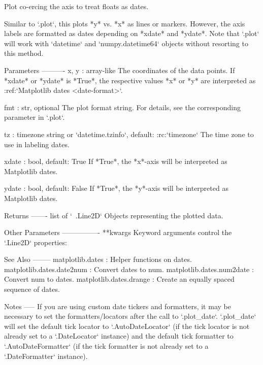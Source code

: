 \begin{DoxyVerb}
\begin{DoxyVerb}Plot co-ercing the axis to treat floats as dates.

Similar to `.plot`, this plots *y* vs. *x* as lines or markers.
However, the axis labels are formatted as dates depending on *xdate*
and *ydate*.  Note that `.plot` will work with `datetime` and
`numpy.datetime64` objects without resorting to this method.

Parameters
----------
x, y : array-like
    The coordinates of the data points. If *xdate* or *ydate* is
    *True*, the respective values *x* or *y* are interpreted as
    :ref:`Matplotlib dates <date-format>`.

fmt : str, optional
    The plot format string. For details, see the corresponding
    parameter in `.plot`.

tz : timezone string or `datetime.tzinfo`, default: :rc:`timezone`
    The time zone to use in labeling dates.

xdate : bool, default: True
    If *True*, the *x*-axis will be interpreted as Matplotlib dates.

ydate : bool, default: False
    If *True*, the *y*-axis will be interpreted as Matplotlib dates.

Returns
-------
list of `~.Line2D`
    Objects representing the plotted data.

Other Parameters
----------------
**kwargs
    Keyword arguments control the `.Line2D` properties:


See Also
--------
matplotlib.dates : Helper functions on dates.
matplotlib.dates.date2num : Convert dates to num.
matplotlib.dates.num2date : Convert num to dates.
matplotlib.dates.drange : Create an equally spaced sequence of dates.

Notes
-----
If you are using custom date tickers and formatters, it may be
necessary to set the formatters/locators after the call to
`.plot_date`. `.plot_date` will set the default tick locator to
`.AutoDateLocator` (if the tick locator is not already set to a
`.DateLocator` instance) and the default tick formatter to
`.AutoDateFormatter` (if the tick formatter is not already set to a
`.DateFormatter` instance).
\end{DoxyVerb}
 \mbox{\label{classmatplotlib_1_1axes_1_1__axes_1_1Axes_ab4edfabd143c5dd434337450f190eb20}} 

\end{DoxyVerb}
